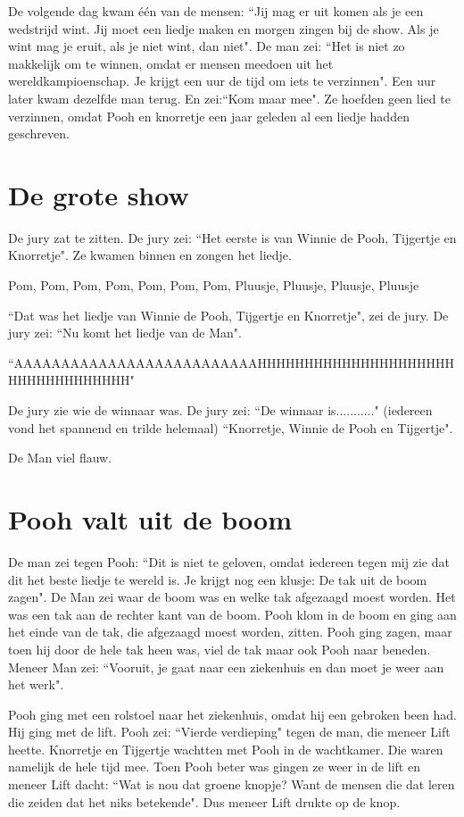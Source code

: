\documentclass{article}
\begin{document}
De volgende dag kwam één van de mensen: ``Jij mag er uit komen als je een wedstrijd wint. Jij moet een liedje maken en morgen zingen bij de show. Als je wint mag je eruit, als je niet wint, dan niet". De man zei: ``Het is niet zo makkelijk om te winnen, omdat er mensen meedoen uit het wereldkampioenschap. Je krijgt een uur de tijd om iets te verzinnen". Een uur later kwam dezelfde man terug. En zei:``Kom maar mee". Ze hoefden geen lied te verzinnen, omdat Pooh en knorretje een jaar geleden al een liedje hadden geschreven.

\section{De grote show}

De jury zat te zitten. De jury zei: ``Het eerste is van Winnie de Pooh, Tijgertje en Knorretje". Ze kwamen binnen en zongen het liedje.

Pom, Pom, Pom, Pom, Pom, Pom, Pom,
Pluusje, Pluusje, Pluusje, Pluusje

``Dat was het liedje van Winnie de Pooh, Tijgertje en Knorretje", zei de jury. De jury zei: ``Nu komt het liedje van de Man".

``AAAAAAAAAAAAAAAAAAAAAAAAAAHHHHHHHHHHHHHHHHHHHHHHHHHHHHHHHHHH"

De jury zie wie de winnaar was. De jury zei: ``De winnaar is..........." (iedereen vond het spannend en trilde helemaal) ``Knorretje, Winnie de Pooh en Tijgertje".

De Man viel flauw.

\section{Pooh valt uit de boom}

De man zei tegen Pooh: ``Dit is niet te geloven, omdat iedereen tegen mij zie dat dit het beste liedje te wereld is. Je krijgt nog een klusje: De tak uit de boom zagen". De Man zei waar de boom was en welke tak afgezaagd moest worden. Het was een tak aan de rechter kant van de boom. Pooh klom in de boom en ging aan het einde van de tak, die afgezaagd moest worden, zitten. Pooh ging zagen, maar toen hij door de hele tak heen was, viel de tak maar ook Pooh naar beneden. Meneer Man zei: ``Vooruit, je gaat naar een ziekenhuis en dan moet je weer aan het werk".

Pooh ging met een rolstoel naar het ziekenhuis, omdat hij een gebroken been had. Hij ging met de lift. Pooh zei: ``Vierde verdieping" tegen de man, die meneer Lift heette. Knorretje en Tijgertje wachtten met Pooh in de wachtkamer. Die waren namelijk de hele tijd mee. Toen Pooh beter was gingen ze weer in de lift en meneer Lift dacht: ``Wat is nou dat groene knopje? Want de mensen die dat leren die zeiden dat het niks betekende". Dus meneer Lift drukte op de knop.
\end{document}
